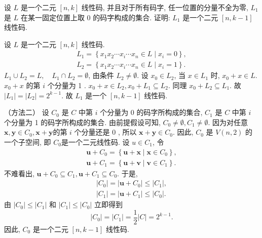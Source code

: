 \begin{exercise}
    设 $ L $ 是一个二元 $ [n, k] $ 线性码, 并且对于所有码字, 任一位置的分量不全为零, $ L_{1} $ 是 $ L $ 在某一固定位置上取 0 的码字构成的集合. 证明: $ L_{1} $ 是一个二元 $ [n, k-1] $ 线性码.
\end{exercise}
\begin{solution}
    设 $ L $ 是一个二元 $ [n, k] $ 线性码.
$$
\begin{array}{l}
L_{1}=\left\{x_{1} x_{2} \cdots x_{i} \cdots x_{n} \in L \mid x_{i}=0\right\}, \\
L_{2}=\left\{x_{1} x_{2} \cdots x_{i} \cdots x_{n} \in L \mid x_{i}=1\right\} .
\end{array}
$$
$ L_{1} \cup L_{2}=L, \quad L_{1} \cap L_{2}=\emptyset $, 由条件 $ L_{2} \neq \emptyset $.
设 $ x_{0} \in L_{2} $, 当 $ x \in L_{1} $ 时, $ x_{0}+x \in L $. $ x_{0}+x $ 的第 $ i $ 个分量为 1 . $ x_{0}+x \in L_{2}, x_{0}+L_{1} \subseteq L_{2} $. 同理 $ x_{0}+L_{2} \subseteq L_{1} $.
故 $ \left|L_{1}\right|=\left|L_{2}\right|=2^{k-1} $.
故 $ L_{1} $ 是一个 $ [n, k-1] $ 线性码.

（方法二）
 设 $ C_{0} $ 是 $ C $ 中第 $ i $ 个分量为 0 的码字所构成的集合, $ C_{1} $ 是 $ C $ 中第 $ i $ 个分量为 1 的码字所构成的集合. 由前提假设可知, $ C_{0} \neq \emptyset, C_{1} \neq \emptyset $. 因为对任意 $ \boldsymbol{x}, \boldsymbol{y} \in C_{0}, \boldsymbol{x}+\boldsymbol{y} $的第 $ i $ 个分量还是 0 , 所以 $ \boldsymbol{x}+\boldsymbol{y} \in C_{0} $. 因此, $ C_{0} $ 是 $ V(n, 2) $ 的一个子空间, 即 $ C_{0} $是一个二元线性码. 设 $ u \in C_{1} $, 令
$$
\begin{array}{l}
\boldsymbol{u}+C_{0}=\left\{\boldsymbol{u}+\boldsymbol{x} \mid \boldsymbol{x} \in C_{0}\right\}, \\
\boldsymbol{u}+C_{1}=\left\{\boldsymbol{u}+\boldsymbol{v} \mid \boldsymbol{v} \in C_{1}\right\} .
\end{array}
$$
不难看出, $ \boldsymbol{u}+C_{0} \subseteq C_{1}, \boldsymbol{u}+C_{1} \subseteq C_{0} $. 于是,
$$
\begin{array}{l}
\left|C_{0}\right|=\left|\boldsymbol{u}+C_{0}\right| \leq\left|C_{1}\right|, \\
\left|C_{1}\right|=\left|\boldsymbol{u}+C_{1}\right| \leq\left|C_{0}\right| .
\end{array}
$$
由 $ \left|C_{0}\right| \leq\left|C_{1}\right| $ 和 $ \left|C_{1}\right| \leq\left|C_{0}\right| $ 立即得到
$$
\left|C_{0}\right|=\left|C_{1}\right|=\frac{1}{2}|C|=2^{k-1} .
$$
因此, $ C_{0} $ 是一个二元 $ [n, k-1] $ 线性码.
\end{solution}


